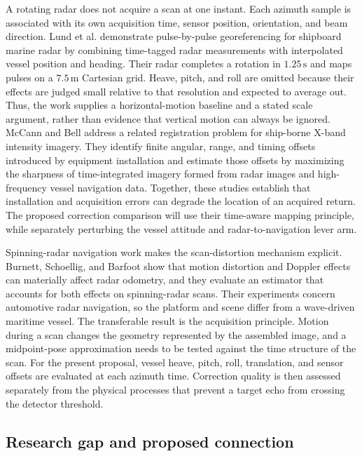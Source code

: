 \documentclass[10pt,letterpaper]{article}
\begin{document}
A rotating radar does not acquire a scan at one instant. Each azimuth sample is associated with its own acquisition time, sensor position, orientation, and beam direction. Lund et al. demonstrate pulse-by-pulse georeferencing for shipboard marine radar by combining time-tagged radar measurements with interpolated vessel position and heading. Their radar completes a rotation in $1.25\,\mathrm{s}$ and maps pulses on a $7.5\,\mathrm{m}$ Cartesian grid. Heave, pitch, and roll are omitted because their effects are judged small relative to that resolution and expected to average out. Thus, the work supplies a horizontal-motion baseline and a stated scale argument, rather than evidence that vertical motion can always be ignored. \cite{Lund2018SeaIceDrift} McCann and Bell address a related registration problem for ship-borne X-band intensity imagery. They identify finite angular, range, and timing offsets introduced by equipment installation and estimate those offsets by maximizing the sharpness of time-integrated imagery formed from radar images and high-frequency vessel navigation data. \cite{McCann2018OffsetCalibration} Together, these studies establish that installation and acquisition errors can degrade the location of an acquired return. The proposed correction comparison will use their time-aware mapping principle, while separately perturbing the vessel attitude and radar-to-navigation lever arm.

Spinning-radar navigation work makes the scan-distortion mechanism explicit. Burnett, Schoellig, and Barfoot show that motion distortion and Doppler effects can materially affect radar odometry, and they evaluate an estimator that accounts for both effects on spinning-radar scans. \cite{Burnett2021MotionDistortion} Their experiments concern automotive radar navigation, so the platform and scene differ from a wave-driven maritime vessel. The transferable result is the acquisition principle. Motion during a scan changes the geometry represented by the assembled image, and a midpoint-pose approximation needs to be tested against the time structure of the scan. For the present proposal, vessel heave, pitch, roll, translation, and sensor offsets are evaluated at each azimuth time. Correction quality is then assessed separately from the physical processes that prevent a target echo from crossing the detector threshold.

\subsection{Research gap and proposed connection}
\end{document}
